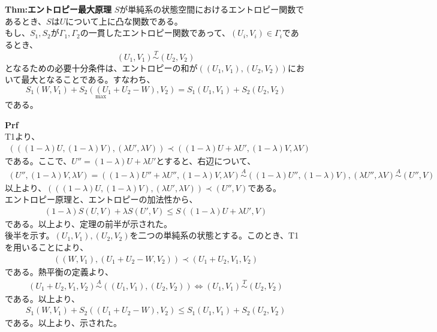 \documentclass[a4paper,11pt]{jsarticle}
\numberwithin{equation}{section}
\begin{document}
\begin{itembox}[l]{\textbf{Thm:エントロピー最大原理}}
    $S$が単純系の状態空間におけるエントロピー関数であるとき、$S$は$U$について上に凸な関数である。\\
    もし、$S_1,S_2$が$\Gamma_1,\Gamma_2$の一貫したエントロピー関数であって、$(U_i,V_i)\in \Gamma_i$であるとき、
    \begin{equation}
        (U_1,V_1) \overset{T}{\sim} (U_2,V_2) 
    \end{equation}
    となるための必要十分条件は、エントロピーの和が$((U_1,V_1),(U_2,V_2))$において最大となることである。すなわち、
    \begin{equation}
        \underset{\text{max}}{S_1(W,V_1)+S_2((U_1+U_2-W),V_2)} =S_1(U_1,V_1)+S_2(U_2,V_2)
    \end{equation}
    である。

\end{itembox}
\textbf{Prf}\\
T1より、
\begin{align}
    (((1-\lambda)U,(1-\lambda)V),(\lambda U',\lambda V)) \prec ((1-\lambda)U+\lambda U',(1-\lambda)V,\lambda V)
\end{align}
である。ここで、$U'' = (1-\lambda)U+\lambda U'$とすると、右辺について、
\begin{align}
    (U'',(1-\lambda)V,\lambda V) =((1-\lambda)U''+\lambda U'',(1-\lambda)V,\lambda V) \overset{A}{\sim} ((1-\lambda)U'',(1-\lambda)V),(\lambda U'',\lambda V) \overset{A}{\sim} (U'',V)
\end{align}
以上より、$    (((1-\lambda)U,(1-\lambda)V),(\lambda U',\lambda V)) \prec (U'',V)$である。\\
エントロピー原理と、エントロピーの加法性から、
\begin{align}
    (1-\lambda)S(U,V)+\lambda S(U',V) \leq S((1-\lambda)U+\lambda U',V)
\end{align}
である。以上より、定理の前半が示された。\\
後半を示す。$(U_1,V_1),(U_2,V_2)$を二つの単純系の状態とする。このとき、T1を用いることにより、
\begin{align}
    ((W,V_1),(U_1+U_2-W,V_2)) \prec (U_1+U_2,V_1,V_2)
\end{align}
である。熱平衡の定義より、
\begin{align}
(U_1+U_2,V_1,V_2) \overset{A}{\sim} ((U_1,V_1),(U_2,V_2)) \Leftrightarrow (U_1,V_1) \overset{T}{\sim} (U_2,V_2)
\end{align}
である。以上より、
\begin{align}
    S_1(W,V_1)+S_2((U_1+U_2-W),V_2) \leq S_1(U_1,V_1)+S_2(U_2,V_2)
\end{align}
である。以上より、示された。\hfill\qedsymbol\\
\end{document}
